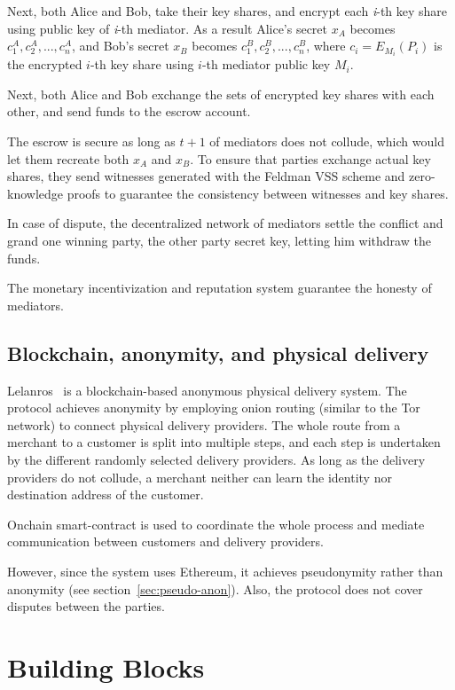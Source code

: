 \documentclass{ieeeaccess}
\begin{document}
Next, both Alice and Bob, take their key shares, and encrypt each
\textit{i}-th key share using public key of \textit{i}-th mediator. As a result
Alice's secret \(x_A\) becomes \({c^A_1, c^A_2,...,c^A_n}\), and Bob's
secret \(x_B\) becomes \({c^B_1, c^B_2,...,c^B_n}\), where
\(c_i = E_{M_i}(P_i)\) is the encrypted \(i\)-th key share using
\(i\)-th mediator public key \(M_i\).

Next, both Alice and Bob exchange the sets of encrypted key shares with
each other, and send funds to the escrow account.

The escrow is secure as long as \(t+1\) of mediators does not collude,
which would let them recreate both \(x_A\) and \(x_B\). To ensure
that parties exchange actual key shares, they send witnesses
generated with the Feldman VSS scheme and zero-knowledge proofs to guarantee the consistency between witnesses and key shares.

In case of dispute, the decentralized network of mediators settle the conflict and grand one winning party, the other party secret key,
letting him withdraw the funds.

The monetary incentivization and reputation system guarantee the honesty of mediators.

\subsection{Blockchain, anonymity, and physical delivery}\label{lelantos-a-blockchain-based-anonymous-physical-delivery-system}

Lelanros~\cite{altawy2017lelantos} is a blockchain-based anonymous
physical delivery system. The protocol achieves anonymity by employing onion routing (similar to the Tor network) to connect physical delivery providers. The whole route from a merchant to a customer is split into multiple steps, and each step is undertaken by the different randomly selected delivery providers. As long as the delivery providers do not collude, a merchant neither can learn the identity nor destination address of the customer.

Onchain smart-contract is used to coordinate the whole process and
mediate communication between customers and delivery providers.

However, since the system uses Ethereum, it achieves pseudonymity rather than anonymity (see section~\ref{sec:pseudo-anon}). Also, the protocol does not cover disputes between the parties.
 
\section{Building Blocks}\label{sec:building-blocks}
\end{document}
